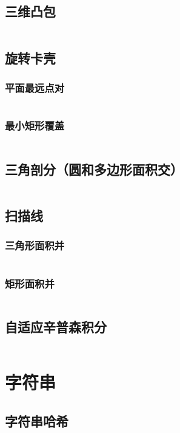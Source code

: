\documentclass[a4paper,11pt]{article}
\begin{document}
\subsection{三维凸包} %
\inputminted[breaklines]{c++}{计算几何/三维凸包.cpp}
\subsection{旋转卡壳} %
\subsubsection{平面最远点对} %
\inputminted[breaklines]{c++}{计算几何/旋转卡壳.cpp}
\subsubsection{最小矩形覆盖} %
\inputminted[breaklines]{c++}{计算几何/最小矩形覆盖.cpp}
\subsection{三角剖分（圆和多边形面积交）} %
\inputminted[breaklines]{c++}{计算几何/三角剖分.cpp}
\subsection{扫描线} %
\subsubsection{三角形面积并} %
\inputminted[breaklines]{c++}{计算几何/三角形面积并.cpp}
\subsubsection{矩形面积并} %
\inputminted[breaklines]{c++}{计算几何/矩形面积并.cpp}
\subsection{自适应辛普森积分} %
\inputminted[breaklines]{c++}{计算几何/自适应辛普森积分.cpp}

\newpage
\section{字符串}
\subsection{字符串哈希}
\inputminted[breaklines]{c++}{字符串/字符串哈希.cpp}
\end{document}
